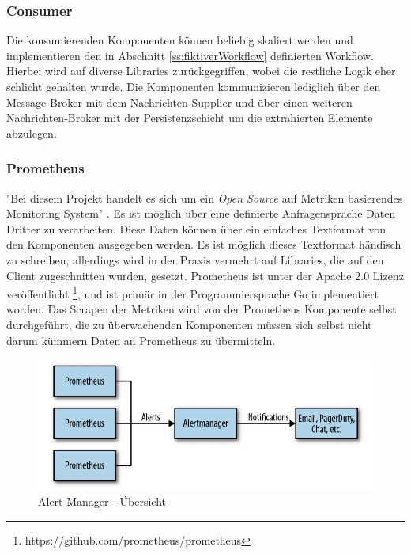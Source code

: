 \subsubsection{Consumer}
Die konsumierenden Komponenten können beliebig skaliert werden und implementieren den in Abschnitt \ref{ss:fiktiverWorkflow} definierten Workflow. Hierbei wird auf diverse Libraries zurückgegriffen, wobei die restliche Logik eher schlicht gehalten wurde. Die Komponenten kommunizieren lediglich über den Message-Broker mit dem Nachrichten-Supplier und über einen weiteren Nachrichten-Broker mit der Persistenzschicht um die extrahierten Elemente abzulegen.


\subsubsection{Prometheus}
"Bei diesem Projekt handelt es sich um ein \emph{Open Source} auf Metriken basierendes Monitoring System" \cite{oreillyPrometheus}. Es ist möglich über eine definierte Anfragensprache Daten Dritter zu verarbeiten. Diese Daten können über ein einfaches Textformat von den Komponenten ausgegeben werden. Es ist möglich dieses Textformat händisch zu schreiben, allerdings wird in der Praxis vermehrt auf Libraries, die auf den Client zugeschnitten wurden, gesetzt. Prometheus ist unter der Apache 2.0 Lizenz veröffentlicht \footnote{https://github.com/prometheus/prometheus}, und ist primär in der Programmiersprache Go implementiert worden. Das Scrapen der Metriken wird von der Prometheus Komponente selbst durchgeführt, die zu überwachenden Komponenten müssen sich selbst nicht darum kümmern Daten an Prometheus zu übermitteln.

\begin{figure}[ht!]
	\centering
	\includegraphics[width=.8\linewidth]{kapitel/problemloesung/implementierung/_img/alert-man-p307}
	\caption[Alert Manager - Übersicht]{Alert Manager - Übersicht \cite[Seite~307]{oreillyPrometheus}}
	\label{fig:alertManOverview}
\end{figure}

